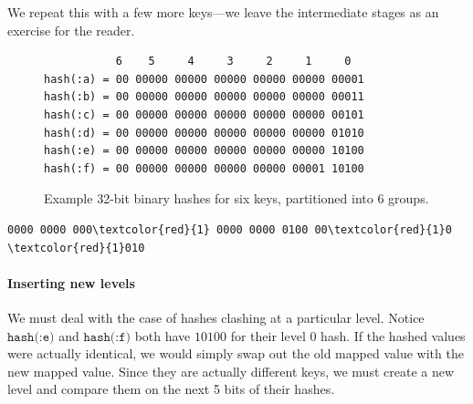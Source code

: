 \documentclass[preprint]{sigplanconf}
\begin{document}
We repeat this with a few more keys---we leave the intermediate
stages as an exercise for the reader.

\begin{figure}
  \begin{verbatim}
           6    5     4     3     2     1     0
hash(:a) = 00 00000 00000 00000 00000 00000 00001
hash(:b) = 00 00000 00000 00000 00000 00000 00011
hash(:c) = 00 00000 00000 00000 00000 00000 00101
hash(:d) = 00 00000 00000 00000 00000 00000 01010
hash(:e) = 00 00000 00000 00000 00000 00000 10100
hash(:f) = 00 00000 00000 00000 00000 00001 10100
  \end{verbatim}
  \label{hashes}
  \caption{Example 32-bit binary hashes for six keys, partitioned
    into 6 groups.}
\end{figure}


\begin{Verbatim}[commandchars=\\\{\},codes={\catcode`$=3\catcode`^=7\catcode`_=8}]
0000 0000 000\textcolor{red}{1} 0000 0000 0100 00\textcolor{red}{1}0 \textcolor{red}{1}010
\end{Verbatim}


\paragraph{Inserting new levels}
We must deal with the case of hashes clashing at
a particular level.
Notice $\texttt{hash(:e)}$ and $\texttt{hash(:f)}$ both have
$10100$ for their level 0 hash.
If the hashed values were actually identical, we would
simply swap out the old mapped value with the new mapped
value.
Since they are actually different keys, we
must create a new level and compare them 
on the next 5 bits of their hashes.
\end{document}
